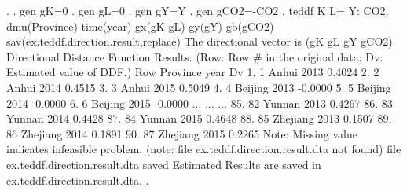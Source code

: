. 
. gen gK=0
{\smallskip}
. gen gL=0
{\smallskip}
. gen gY=Y
{\smallskip}
. gen gCO2=-CO2
{\smallskip}
. teddf K L= Y: CO2, dmu(Province) time(year) gx(gK gL) gy(gY) gb(gCO2) sav(ex.teddf.direction.result,replace)
{\smallskip}
 The directional vector is (gK gL gY gCO2)
{\smallskip}
{\smallskip}
  Directional Distance Function Results:
    (Row: Row \# in the original data; Dv: Estimated value of  DDF.)
{\smallskip}
     {\TLC}
     {\VBAR} Row       Province   year        Dv {\VBAR}
     {\LFTT}
  1. {\VBAR}   1          Anhui   2013    0.4024 {\VBAR}
  2. {\VBAR}   2          Anhui   2014    0.4515 {\VBAR}
  3. {\VBAR}   3          Anhui   2015    0.5049 {\VBAR}
  4. {\VBAR}   4        Beijing   2013   -0.0000 {\VBAR}
  5. {\VBAR}   5        Beijing   2014   -0.0000 {\VBAR}
  6. {\VBAR}   6        Beijing   2015   -0.0000 {\VBAR}
                       ...
                       ...
                       ...
 85. {\VBAR}  82         Yunnan   2013    0.4267 {\VBAR}
 86. {\VBAR}  83         Yunnan   2014    0.4428 {\VBAR}
 87. {\VBAR}  84         Yunnan   2015    0.4648 {\VBAR}
 88. {\VBAR}  85       Zhejiang   2013    0.1507 {\VBAR}
 89. {\VBAR}  86       Zhejiang   2014    0.1891 {\VBAR}
 90. {\VBAR}  87       Zhejiang   2015    0.2265 {\VBAR}
     {\BLC}
Note: Missing value indicates infeasible problem.
(note: file ex.teddf.direction.result.dta not found)
file ex.teddf.direction.result.dta saved
{\smallskip}
Estimated Results are saved in ex.teddf.direction.result.dta.
{\smallskip}
. 
